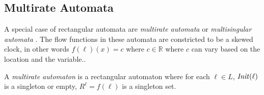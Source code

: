 
\subsection{Multirate Automata}
A special case of rectangular automata are \emph{multirate automata} \cite{Alur1995a,Alur2000,Henzinger1995} or \emph{multisingular automata} \cite{Sproston2000}. The flow functions in these automata are constricted to be a skewed clock, in other words  $f(\ell)(x)=c$ where $c\in \mathbb{R}$ where $c$ can vary based on the location and the variable..

\begin{defi}
A \emph{multirate automaton} is a rectangular automaton where for each $\ell\in L$, $\mathit{Init}(\ell)$ is a singleton or empty, $R^{\ell}=f(\ell)$ is a singleton set.

\end{defi}

